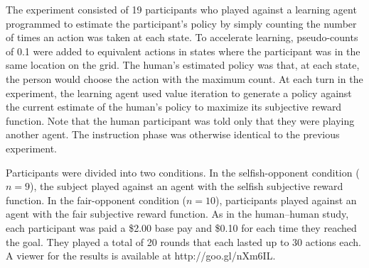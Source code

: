 \documentclass[letterpaper]{article}
\begin{document}
The experiment consisted of 19 participants who played against a
learning agent programmed to estimate the participant's policy by
simply counting the number of times an action was taken at each
state. To accelerate learning, pseudo-counts of 0.1 were added to
equivalent actions in states where the participant was in the same
location on the grid. The human's estimated policy was that, at each
state, the person would choose the action with the maximum count. At
each turn in the experiment, the learning agent used value iteration
to generate a policy against the current estimate of the human's
policy to maximize its subjective reward function. Note that the human
participant was told only that they were playing another agent. The instruction phase was otherwise identical to the previous experiment.

Participants were divided into two conditions. In the selfish-opponent
condition ($n=9$), the subject played against an agent with the
selfish subjective reward function. In the fair-opponent condition
($n=10$), participants played against an agent with the fair
subjective reward function. As in the human--human study, each
participant was paid a \$2.00 base pay and \$0.10 for each time they
reached the goal. They played a total of 20 rounds that each lasted up
to 30 actions each. A viewer for the results is available at
http://goo.gl/nXm6IL.
\end{document}
